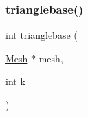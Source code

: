 \mbox{\label{a00602_ae80676d4366a8214050e9ee665b94563}} 
\subsubsection{\texorpdfstring{trianglebase()}{trianglebase()}}
{\footnotesize\ttfamily int trianglebase (\begin{DoxyParamCaption}\item[{\hyperlink{a00557_aeffbe0891ab73a4d8964c9cb7978426e}{Mesh} $\ast$}]{mesh,  }\item[{int}]{k }\end{DoxyParamCaption})}

